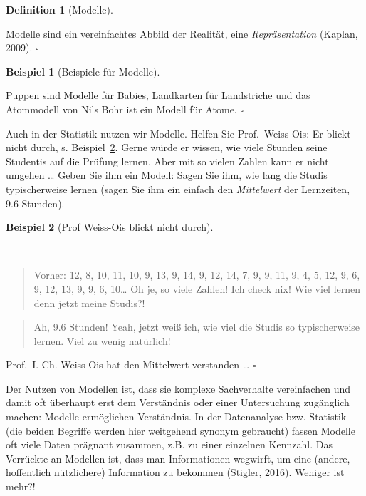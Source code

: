 \documentclass[
  letterpaper,
  twoside,
  open=any]{scrbook}
\theoremstyle{definition}
\newtheorem{definition}{Definition}[chapter]
\theoremstyle{definition}
\theoremstyle{definition}
\newtheorem{example}{Beispiel}[chapter]
\theoremstyle{remark}
\begin{document}
\begin{definition}[Modelle]\protect\hypertarget{def-modelle}{}\label{def-modelle}

Modelle sind ein vereinfachtes Abbild der Realität, eine
\emph{Repräsentation} (Kaplan, 2009). \(\square\)

\end{definition}

\begin{example}[Beispiele für
Modelle]\protect\hypertarget{exm-Modelle}{}\label{exm-Modelle}

Puppen sind Modelle für Babies, Landkarten für Landstriche und das
Atommodell von Nils Bohr ist ein Modell für Atome. \(\square\)

\end{example}

Auch in der Statistik nutzen wir Modelle. Helfen Sie Prof.~Weiss-Ois: Er
blickt nicht durch, s. Beispiel~\ref{exm-weiss-ois}. Gerne würde er
wissen, wie viele Stunden seine Studentis auf die Prüfung lernen. Aber
mit so vielen Zahlen kann er nicht umgehen \ldots{} Geben Sie ihm ein
Modell: Sagen Sie ihm, wie lang die Studis typischerweise lernen (sagen
Sie ihm ein einfach den \emph{Mittelwert} der Lernzeiten, 9.6 Stunden).

\begin{example}[Prof Weiss-Ois blickt nicht
durch]\protect\hypertarget{exm-weiss-ois}{}\label{exm-weiss-ois}

~

\begin{quote}
{} Vorher: 12, 8, 10, 11, 10, 9, 13, 9, 14, 9, 12, 14, 7,
9, 9, 11, 9, 4, 5, 12, 9, 6, 9, 12, 13, 9, 9, 6, 10\ldots{} Oh je, so
viele Zahlen! Ich check nix! Wie viel lernen denn jetzt meine Studis?!
\end{quote}

\begin{quote}
{} Ah, 9.6 Stunden! Yeah, jetzt weiß ich, wie viel die
Studis so typischerweise lernen. Viel zu wenig natürlich!
\end{quote}

Prof.~I. Ch. Weiss-Ois hat den Mittelwert verstanden \ldots{}
\(\square\)

\end{example}

Der Nutzen von Modellen ist, dass sie komplexe Sachverhalte vereinfachen
und damit oft überhaupt erst dem Verständnis oder einer Untersuchung
zugänglich machen: Modelle ermöglichen Verständnis. In der Datenanalyse
bzw. Statistik (die beiden Begriffe werden hier weitgehend synonym
gebraucht) fassen Modelle oft viele Daten prägnant zusammen, z.B. zu
einer einzelnen Kennzahl. Das Verrückte an Modellen ist, dass man
Informationen wegwirft, um eine (andere, hoffentlich nützlichere)
Information zu bekommen (Stigler, 2016). Weniger ist mehr?!
\end{document}
